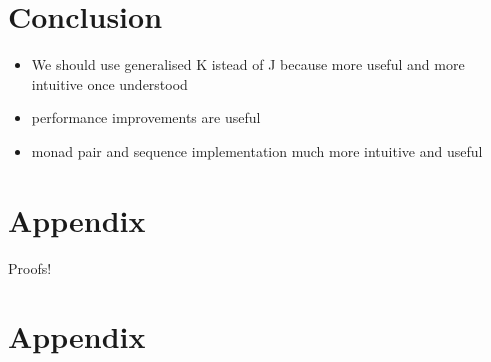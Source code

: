 \documentclass[runningheads]{llncs}
\begin{document}
\section{Conclusion}\label{conclusion}

\begin{itemize}
\tightlist
\item
  We should use generalised K istead of J because more useful and more
  intuitive once understood
\item
  performance improvements are useful
\item
  monad pair and sequence implementation much more intuitive and useful
\end{itemize}

\section{Appendix}\label{appendix}

Proofs!

%
%
%
% 
% 
%



\newpage
\section*{Appendix}
\appendix
\end{document}
